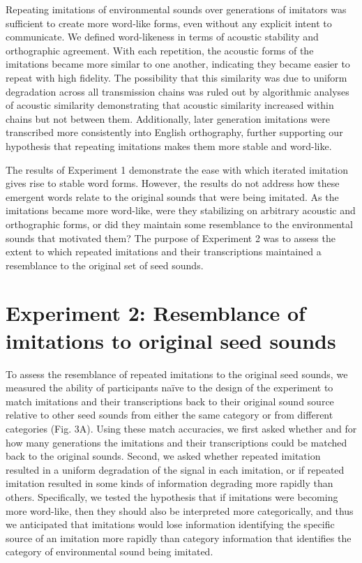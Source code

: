\documentclass[english,floatsintext,man]{apa6}
\theoremstyle{definition}
\theoremstyle{definition}
\theoremstyle{definition}
\theoremstyle{remark}
\begin{document}
Repeating imitations of environmental sounds over generations of
imitators was sufficient to create more word-like forms, even without
any explicit intent to communicate. We defined word-likeness in terms of
acoustic stability and orthographic agreement. With each repetition, the
acoustic forms of the imitations became more similar to one another,
indicating they became easier to repeat with high fidelity. The
possibility that this similarity was due to uniform degradation across
all transmission chains was ruled out by algorithmic analyses of
acoustic similarity demonstrating that acoustic similarity increased
within chains but not between them. Additionally, later generation
imitations were transcribed more consistently into English orthography,
further supporting our hypothesis that repeating imitations makes them
more stable and word-like.

The results of Experiment 1 demonstrate the ease with which iterated
imitation gives rise to stable word forms. However, the results do not
address how these emergent words relate to the original sounds that were
being imitated. As the imitations became more word-like, were they
stabilizing on arbitrary acoustic and orthographic forms, or did they
maintain some resemblance to the environmental sounds that motivated
them? The purpose of Experiment 2 was to assess the extent to which
repeated imitations and their transcriptions maintained a resemblance to
the original set of seed sounds.

\hypertarget{experiment-2-resemblance-of-imitations-to-original-seed-sounds}{%
\section{Experiment 2: Resemblance of imitations to original seed
sounds}\label{experiment-2-resemblance-of-imitations-to-original-seed-sounds}}

To assess the resemblance of repeated imitations to the original seed
sounds, we measured the ability of participants naïve to the design of
the experiment to match imitations and their transcriptions back to
their original sound source relative to other seed sounds from either
the same category or from different categories (Fig. 3A). Using these
match accuracies, we first asked whether and for how many generations
the imitations and their transcriptions could be matched back to the
original sounds. Second, we asked whether repeated imitation resulted in
a uniform degradation of the signal in each imitation, or if repeated
imitation resulted in some kinds of information degrading more rapidly
than others. Specifically, we tested the hypothesis that if imitations
were becoming more word-like, then they should also be interpreted more
categorically, and thus we anticipated that imitations would lose
information identifying the specific source of an imitation more rapidly
than category information that identifies the category of environmental
sound being imitated.
\end{document}
